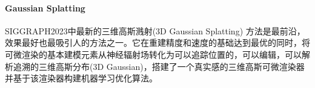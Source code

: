 \paragraph{Gaussian Splatting}

SIGGRAPH2023中最新的三维高斯溅射(3D Gaussian Splatting) \cite{kerbl3DGaussianSplatting2023} 方法是最前沿，效果最好也最吸引人的方法之一。它在重建精度和速度的基础达到最优的同时，将可微渲染的基本建模元素从神经辐射场转化为可以追踪位置的，可以编辑，可以解析追溯的三维高斯分布(3D Gaussian)，搭建了一个真实感的三维高斯可微渲染器并基于该渲染器构建机器学习优化算法。

